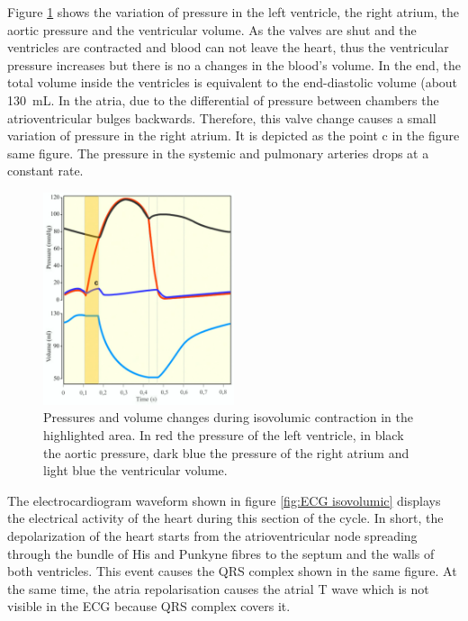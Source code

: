 Figure \ref{fig:pressure isovolumic} shows the variation of pressure in the left ventricle, the right atrium, the aortic pressure and the ventricular volume. As the valves are shut and the ventricles are contracted and blood can not leave the heart, thus the ventricular pressure increases but there is no a changes in the blood's volume. In the end, the total volume inside the ventricles is equivalent to the end-diastolic volume (about \SI{130}{\milli\liter}. In the atria, due to the differential of pressure between chambers the atrioventricular bulges backwards. Therefore, this valve change causes a small variation of pressure in the right atrium. It is depicted as the point c in the figure same figure. The pressure in the systemic and pulmonary arteries drops at a constant rate. 

\begin{figure}[!htpb]
	\centering
	\includegraphics[width=0.5\textwidth,keepaspectratio]{figure_4}    
	\caption[Isovolumic contraction - pressure and volume changes]{Pressures and volume changes during isovolumic contraction in the highlighted area. In red the pressure of the left ventricle, in black the aortic pressure, dark blue the pressure of the right atrium and light blue the ventricular volume.}
	\label{fig:pressure isovolumic}
\end{figure}

The electrocardiogram waveform shown in figure \ref{fig:ECG isovolumic} displays the electrical activity of the heart during this section of the cycle. In short, the depolarization of the heart starts from the atrioventricular node spreading through the bundle of His and Punkyne fibres to the septum and the walls of both ventricles. This event causes the QRS complex shown in the same figure. At the same time, the atria repolarisation causes the atrial T wave which is not visible in the ECG because QRS complex covers it.

